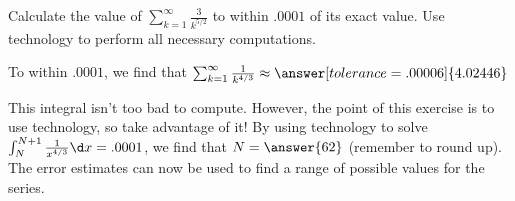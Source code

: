 \documentclass{ximera}
\author{Jim Talamo}
\begin{document}
\begin{exercise}

Calculate the value of $\sum_{k=1}^{\infty} \frac{3}{k^{5/2}}$ to within $.0001$ of its exact value.  Use technology to perform all necessary computations.


To within $.0001$, we find that $\sum_{k=1}^{\infty}  \frac{1}{k^{4/3}} \approx \answer[tolerance=.00006]{4.02446}$
\begin{hint}
This integral isn't too bad to compute.  However, the point of this exercise is to use technology, so take advantage of it!  By using technology to solve $\int_N^{N+1} \frac{1}{x^{4/3}} \d x =.0001$, we find that $N = \answer{62}$ (remember to round up).  The error estimates can now be used to find a range of possible values for the series.
\end{hint}

\end{exercise}
\end{document}

